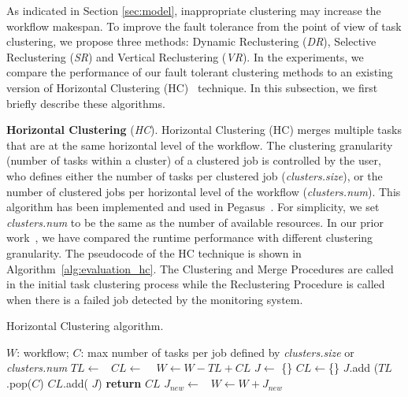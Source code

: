 \documentclass{IOS-Book-Article}
\begin{document}
As indicated in Section \ref{sec:model}, inappropriate clustering may increase the workflow makespan. To improve the fault tolerance from the point of view of task clustering, we propose three methods: Dynamic Reclustering (\emph{DR}), Selective Reclustering (\emph{SR}) and Vertical Reclustering (\emph{VR}). In the experiments, we compare the performance of our fault tolerant clustering methods to an existing version of Horizontal Clustering (HC)~\cite{Singh2008} technique. In this subsection, we first briefly describe these algorithms.

\textbf{Horizontal Clustering} (\emph{HC}). 
Horizontal Clustering (HC) merges multiple tasks that are at the same horizontal level of the workflow. The clustering granularity (number of tasks within a cluster) of a clustered job is controlled by the user, who defines either the number of tasks per clustered job (\emph{clusters.size}), or the number of clustered jobs per horizontal level of the workflow (\emph{clusters.num}). This algorithm has been implemented and used in Pegasus~\cite{Singh2008}. For simplicity, we set \emph{clusters.num} to be the same as the number of available resources. In our prior work~\cite{Chen2013a,Chen2013b}, we have compared the runtime performance with different clustering granularity. The pseudocode of the HC technique is shown in Algorithm~\ref{alg:evaluation_hc}. The Clustering and Merge Procedures are called in the initial task clustering process while the Reclustering Procedure is called when there is a failed job detected by the monitoring system. 

\begin{algorithm}[!htb]
	\footnotesize
	\caption{Horizontal Clustering algorithm.}
	\label{alg:evaluation_hc}
	\begin{algorithmic}[1]
		\Require $W$: workflow; $C$: max number of tasks per job defined by \emph{clusters.size} or \emph{clusters.num}
				\State $TL\gets $\  
				\State $CL\gets$  \  
				\State $W \gets W - TL + CL$   
			\EndFor
		\EndProcedure
			\State $J\gets$ \{\}
			\State $CL\gets$\{\}
				\State $J$.add ($TL$.pop($C$) 
				\State  $CL$.add( $J$)
			\EndWhile
			\State \textbf{return} $CL$
		\EndProcedure
			\State $J_{new}\gets$\  
			\State $W \gets W + J_{new}$ 
		\EndProcedure
	\end{algorithmic}
\end{algorithm}
\end{document}
